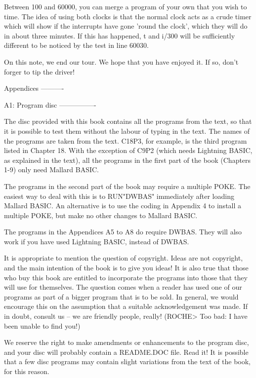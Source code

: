 Between  100 and 60000, you can merge a program of your own that you  wish  to 
time.  The idea of using both clocks is that the normal clock acts as a  crude 
timer  which  will show if the interrupts have gone 'round the  clock',  which 
they will do in about three minutes. If this has happened, t and i/300 will be 
sufficiently different to be noticed by the test in line 60030.

On this note, we end our tour. We hope that you have enjoyed it. If so,  don't 
forger to tip the driver!


Appendices
----------

A1: Program disc
----------------

The  disc provided with this book contains all the programs from the text,  so 
that it is possible to test them without the labour of typing in the text. The 
names  of  the programs are taken from the text. C18P3, for  example,  is  the 
third  program listed in Chapter 18. With the exception of C9P2  (which  needs 
Lightning BASIC, as explained in the text), all the programs in the first part 
of the book (Chapters 1-9) only need Mallard BASIC.

The  programs in the second part of the book may require a multiple POKE.  The 
easiest  way  to  deal with this is to RUN"DWBAS"  immediately  after  loading 
Mallard BASIC. An alternative is to use the coding in Appendix 4 to install  a 
multiple POKE, but make no other changes to Mallard BASIC.

The programs in the Appendices A5 to A8 do require DWBAS. They will also  work 
if you have used Lightning BASIC, instead of DWBAS.

It  is  appropriate  to  mention the question  of  copyright.  Ideas  are  not 
copyright, and the main intention of the book is to give you ideas! It is also 
true  that  those who buy this book are entitled to incorporate  the  programs 
into those that they will use for themselves. The question comes when a reader 
has  used one of our programs as part of a bigger program that is to be  sold. 
In  general,  we  would  encourage this on  the  assumption  that  a  suitable 
acknowledgement  was made. If in doubt, consult us -- we are friendly  people, 
really! (ROCHE> Too bad: I have been unable to find you!)

We  reserve the right to make amendments or enhancements to the program  disc, 
and your disc will probably contain a README.DOC file. Read it! It is possible 
that  a few disc programs may contain slight variations from the text  of  the 
book, for this reason.


